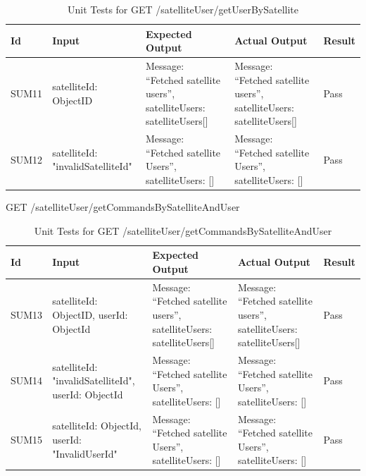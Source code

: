 \documentclass[12pt, titlepage]{article}
\begin{document}
\begin{center}
\begin{longtable}{|p{2cm} | p{3cm} |p{2cm}| p{2cm} |p{2cm}|}
\caption{Unit Tests for \newline GET /satelliteUser/getUserBySatellite}
\hline
\textbf{Id}  & \textbf{Input} & \textbf{Expected Output} & \textbf{Actual Output} & \textbf{Result} \\
\hline
SUM11 &  { satelliteId: ObjectID } & { Message: “Fetched satellite users”,
satelliteUsers: satelliteUsers[] } & { Message: “Fetched satellite users”,
satelliteUsers: satelliteUsers[] } & Pass
\\
\hline
SUM12  & { satelliteId: "invalidSatelliteId"} & { Message: “Fetched satellite Users”,
satelliteUsers: [] } & { Message: “Fetched satellite Users”,
satelliteUsers: [] } & Pass
\\
\hline

\end{longtable}

\end{center}


GET /satelliteUser/getCommandsBySatelliteAndUser

\begin{center}
\begin{longtable}{|p{1.5cm} | p{3cm} |p{2cm}| p{2cm} |p{2cm}|}
\caption{Unit Tests for \newline GET /satelliteUser/getCommandsBySatelliteAndUser}
\hline
\textbf{Id} & \textbf{Input} & \textbf{Expected Output} & \textbf{Actual Output} & \textbf{Result} \\
\hline
SUM13 &   { satelliteId: ObjectID, userId: ObjectId } & { Message: “Fetched satellite users”,
satelliteUsers: satelliteUsers[] } & { Message: “Fetched satellite users”,
satelliteUsers: satelliteUsers[] } & Pass
\\
\hline
SUM14 &   { satelliteId: "invalidSatelliteId", userId: ObjectId} & { Message: “Fetched satellite Users”,
satelliteUsers: [] } & { Message: “Fetched satellite Users”,
satelliteUsers: [] } & Pass
\\
\hline
SUM15 &   { satelliteId: ObjectId, userId: "InvalidUserId"} & { Message: “Fetched satellite Users”,
satelliteUsers: [] } & { Message: “Fetched satellite Users”,
satelliteUsers: [] } & Pass
\\
\hline

\end{longtable}

\end{center}
\end{document}
